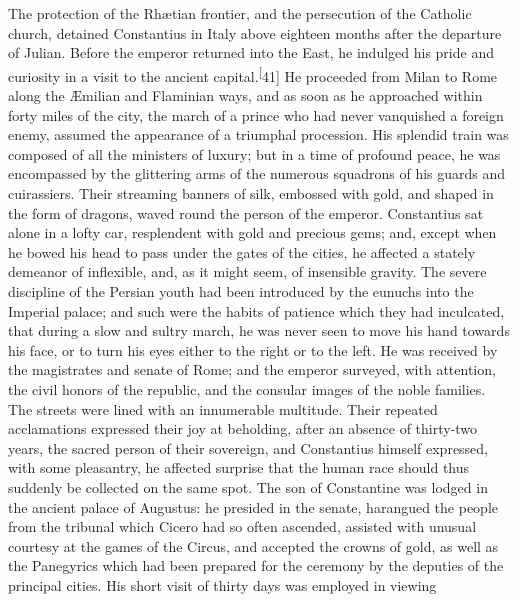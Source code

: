 
The protection of the Rhætian frontier, and the persecution of
the Catholic church, detained Constantius in Italy above eighteen
months after the departure of Julian. Before the emperor returned
into the East, he indulged his pride and curiosity in a visit to
the ancient capital.\textsuperscript[41] He proceeded from Milan to Rome along the
Æmilian and Flaminian ways, and as soon as he approached within
forty miles of the city, the march of a prince who had never
vanquished a foreign enemy, assumed the appearance of a triumphal
procession. His splendid train was composed of all the ministers
of luxury; but in a time of profound peace, he was encompassed by
the glittering arms of the numerous squadrons of his guards and
cuirassiers. Their streaming banners of silk, embossed with gold,
and shaped in the form of dragons, waved round the person of the
emperor. Constantius sat alone in a lofty car, resplendent with
gold and precious gems; and, except when he bowed his head to
pass under the gates of the cities, he affected a stately
demeanor of inflexible, and, as it might seem, of insensible
gravity. The severe discipline of the Persian youth had been
introduced by the eunuchs into the Imperial palace; and such were
the habits of patience which they had inculcated, that during a
slow and sultry march, he was never seen to move his hand towards
his face, or to turn his eyes either to the right or to the left.
He was received by the magistrates and senate of Rome; and the
emperor surveyed, with attention, the civil honors of the
republic, and the consular images of the noble families. The
streets were lined with an innumerable multitude. Their repeated
acclamations expressed their joy at beholding, after an absence
of thirty-two years, the sacred person of their sovereign, and
Constantius himself expressed, with some pleasantry, he affected
surprise that the human race should thus suddenly be collected on
the same spot. The son of Constantine was lodged in the ancient
palace of Augustus: he presided in the senate, harangued the
people from the tribunal which Cicero had so often ascended,
assisted with unusual courtesy at the games of the Circus, and
accepted the crowns of gold, as well as the Panegyrics which had
been prepared for the ceremony by the deputies of the principal
cities. His short visit of thirty days was employed in viewing
